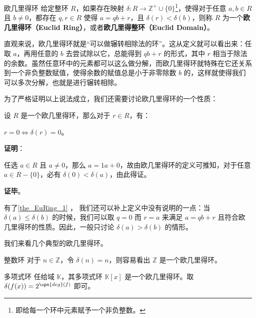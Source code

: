 

\begin{definition}{欧几里得环}
给定整环 $R$，如果存在映射 $\delta:R\to\mathbb{Z}^+\cup\{0\}$\footnote{即给每一个环中元素赋予一个非负整数。}，使得对于任意 $a, b\in R$ 且 $b\not=0$，都存在 $q, r\in R$ 使得 $a=qb+r$，且 $\delta(r)<\delta(b)$，则称 $R$ 为一个\textbf{欧几里得环（Euclid Ring）}，或者\textbf{欧几里得整环（Euclid Domain）}。
\end{definition}



直观来说，欧几里得环就是“可以做辗转相除法的环”。这从定义就可以看出来：任取 $a$，再用任意的 $b$ 去尝试除以它，总能得到 $qb+r$ 的形式，其中 $r$ 相当于除法的余数。虽然任意环中的元素都可以这么做分解，而欧几里得环就特殊在它还关系到一个非负整数赋值，使得余数的赋值总是小于非零除数 $b$ 的，这样就使得我们可以多次分解，也就是进行辗转相除。

为了严格证明以上说法成立，我们还需要讨论欧几里得环的一个性质：

\begin{theorem}{}\label{the_EuRing_1}
设 $R$ 是一个欧几里得环，那么对于 $r\in R$，有：

$r=0\iff \delta(r)=0$。
\end{theorem}

\textbf{证明}：

任选 $a\in R$ 且 $a\not=0$，那么 $a=1a+0$，故由欧几里得环的定义可推知，对于任意 $a\in R-\{0\}$，必有 $\delta(0)<\delta(a)$，由此得证。

\textbf{证毕}。

有了\autoref{the_EuRing_1} ， 我们还可以补上定义中没有说明的一点：当 $\delta(a)\leq\delta(b)$ 的时候，我们可以取 $q=0$ 而 $r=a$ 来满足 $a=qb+r$ 且符合欧几里得环的性质。因此，一般只讨论 $\delta(a)>\delta(b)$ 的情形。

我们来看几个典型的欧几里得环。

\begin{example}{整数环}
对于 $n\in\mathbb{Z}$，令 $\delta(n)=n$，则容易看出 $\mathbb{Z}$ 是一个欧几里得环。
\end{example}

\begin{example}{多项式环}
任给域 $\mathbb{K}$，其多项式环 $\mathbb{K}[x]$ 是一个欧几里得环。取 $\delta(f(x))=2^{\opn{deg}(f)}$ 即可。
\end{example}

